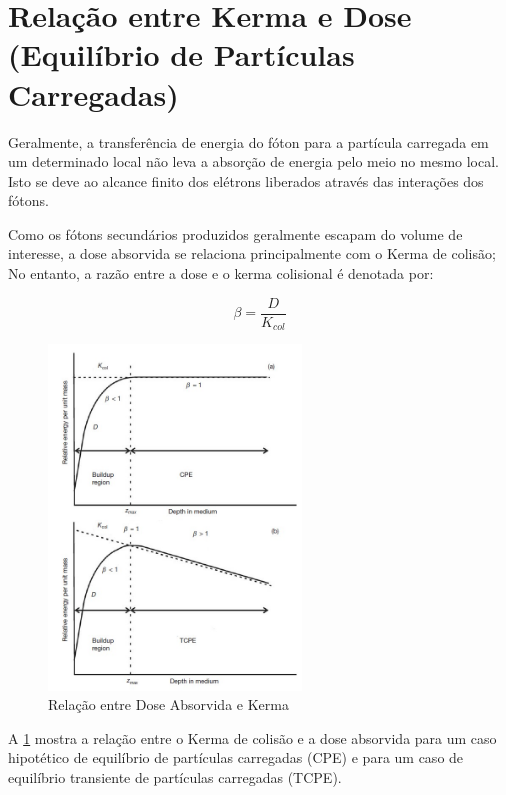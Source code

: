 \documentclass[11pt,a4paper]{article}
\begin{document}
		

	\section{Relação entre Kerma e Dose (Equilíbrio de Partículas Carregadas)}
		

		Geralmente, a transferência de energia do fóton para a partícula carregada em um determinado local não leva a absorção de energia pelo meio no mesmo local. Isto se deve ao alcance finito dos elétrons liberados através das interações dos fótons.

		Como os fótons secundários produzidos geralmente escapam do volume de interesse, a dose absorvida se relaciona principalmente com o Kerma de colisão; No entanto, a razão entre a dose e o kerma colisional é denotada por:

		\begin{equation}
			\beta = \frac{D}{K_{col}}
		\end{equation}

		\begin{figure}[h]
			\centering
			\includegraphics[width=0.60\textwidth]{Imagens/relacaoKermaEDose.jpg}
			\caption{Relação entre Dose Absorvida e Kerma}
			\label{fig:relacaoKermaEDose}
		\end{figure}
		
		A   \ref{fig:relacaoKermaEDose} mostra a relação entre o Kerma de colisão e a dose absorvida para um caso hipotético de equilíbrio de partículas carregadas (CPE) e para um caso de equilíbrio transiente de partículas carregadas (TCPE).
\end{document}
